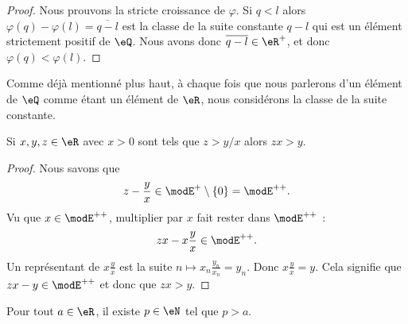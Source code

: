 \begin{proof}
    Nous prouvons la stricte croissance de \( \varphi\). Si \( q< l\) alors \( \varphi(q)-\varphi(l)=\overline{ q-l }\) est la classe de la suite constante \( q-l\) qui est un élément strictement positif de \( \eQ\). Nous avons donc \( \overline{ q-l }\in \eR^+\), et donc \( \varphi(q)<\varphi(l)\).
\end{proof}

\begin{remark}
    Comme déjà mentionné plus haut, à chaque fois que nous parlerons d'un élément de \( \eQ\) comme étant un élément de \( \eR\), nous considérons la classe de la suite constante.
\end{remark}

\begin{lemma}       \label{LemooYNOVooOwoRwD}
    Si \( x,y,z\in \eR\) avec \( x>0\) sont tels que \( z>y/x\) alors \( zx>y\).
\end{lemma}

\begin{proof}
    Nous savons que 
    \begin{equation}
        z-\frac{ y }{ x }\in \modE^+\setminus\{ 0 \}=\modE^{++}. 
    \end{equation}
    Vu que \( x\in\modE^{++}\), multiplier par \( x\) fait rester dans \( \modE^{++}\) :
    \begin{equation}
        zx-x\frac{ y }{ x }\in \modE^{++}.
    \end{equation}
    Un représentant de \( x\frac{ y }{ x }\) est la suite \( n\mapsto x_n\frac{ y_n }{ x_n }=y_n\). Donc \( x\frac{ y }{ x }=y\). Cela signifie que \( zx-y\in\modE^{++}\) et donc que \( zx>y\).
\end{proof}

\begin{lemma}       \label{LemooMWOUooVWgaEi}
    Pour tout \( a\in \eR\), il existe \( p\in \eN\) tel que \( p>a\). 
\end{lemma}

